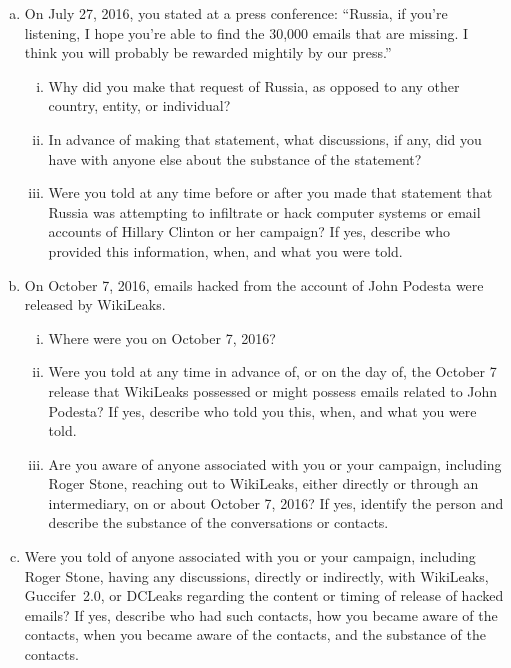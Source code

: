 \begin{enumerate}[a.]
\item On July 27, 2016, you stated at a press conference: “Russia, if you’re listening, I hope you’re able to find the 30,000 emails that are missing.
I think you will probably be rewarded mightily by our press.”

\begin{enumerate}[i.]

\item Why did you make that request of Russia, as opposed to any other country, entity, or individual?

\item In advance of making that statement, what discussions, if any, did you have with anyone else about the substance of the statement?

\item Were you told at any time before or after you made that statement that Russia was attempting to infiltrate or hack computer systems or email accounts of Hillary Clinton or her campaign?
If yes, describe who provided this information, when, and what you were told.

\end{enumerate}

\item On October 7, 2016, emails hacked from the account of John Podesta were released by WikiLeaks.

\begin{enumerate}[i.]

\item Where were you on October 7, 2016?

\item Were you told at any time in advance of, or on the day of, the October 7 release that WikiLeaks possessed or might possess emails related to John Podesta?
If yes, describe who told you this, when, and what you were told.

\item Are you aware of anyone associated with you or your campaign, including Roger Stone, reaching out to WikiLeaks, either directly or through an intermediary, on or about October 7, 2016?
If yes, identify the person and describe the substance of the conversations or contacts.

\end{enumerate}

\item Were you told of anyone associated with you or your campaign, including Roger Stone, having any discussions, directly or indirectly, with WikiLeaks, Guccifer~2.0, or DCLeaks regarding the content or timing of release of hacked emails?
If yes, describe who had such contacts, how you became aware of the contacts, when you became aware of the contacts, and the substance of the contacts.


\end{enumerate}
